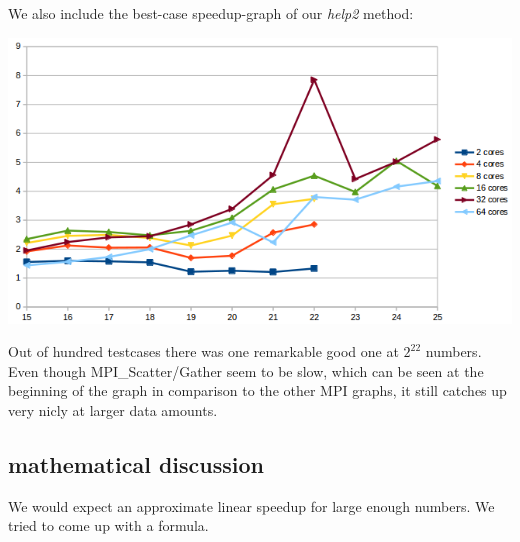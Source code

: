 We also include the best-case speedup-graph of our \textit{help2} method:
\begin{center}
\includegraphics[width=\textwidth]{MPI_help2}
\end{center}

Out of hundred testcases there was one remarkable good one at \(2^{22}\) numbers. Even though MPI\_Scatter/Gather seem to be slow, which can be seen at the beginning of the graph in comparison to the other MPI graphs, it still catches up very nicly at larger data amounts.
   
\subsection{mathematical discussion}
We would expect an approximate linear speedup for large enough numbers. We tried to come up with a formula.

